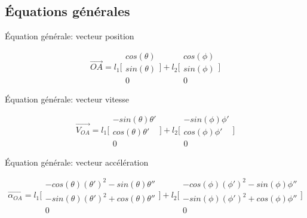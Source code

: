 \documentclass{article}
\begin{document}
\subsection{Équations générales}
\noindent Équation générale: vecteur position

\begin{equation}
\overrightarrow{OA} = 
    l_1\Bigg[\begin{array}{cc}
    cos(\theta) \\
    sin(\theta) \\
    0
    \end{array}\Bigg]
    +
    l_2\Bigg[\begin{array}{cc}
    cos(\phi) \\
    sin(\phi) \\
    0
    \end{array}\Bigg]
\end{equation}

\noindent Équation générale: vecteur vitesse

\begin{equation}
\overrightarrow{V_{OA}} = 
    l_1\Bigg[\begin{array}{cc}
    -sin(\theta)\theta' \\
    cos(\theta)\theta' \\
    0
    \end{array}\Bigg]
    +
    l_2\Bigg[\begin{array}{cc}
    -sin(\phi)\phi' \\
    cos(\phi)\phi' \\
    0
    \end{array}\Bigg]
\end{equation}

\noindent Équation générale: vecteur accélération

\begin{equation}
\overrightarrow{\alpha_{OA}} =
	l_1\Bigg[\begin{array}{cc}
	-cos(\theta)(\theta')^2-sin(\theta)\theta'' \\
	-sin(\theta)(\theta')^2+cos(\theta)\theta'' \\
	0
	\end{array}\Bigg]
	+
	l_2\Bigg[\begin{array}{cc}
	-cos(\phi)(\phi')^2-sin(\phi)\phi'' \\
	-sin(\phi)(\phi')^2+cos(\phi)\phi'' \\
	0
	\end{array}\Bigg]
\end{equation}
\end{document}
